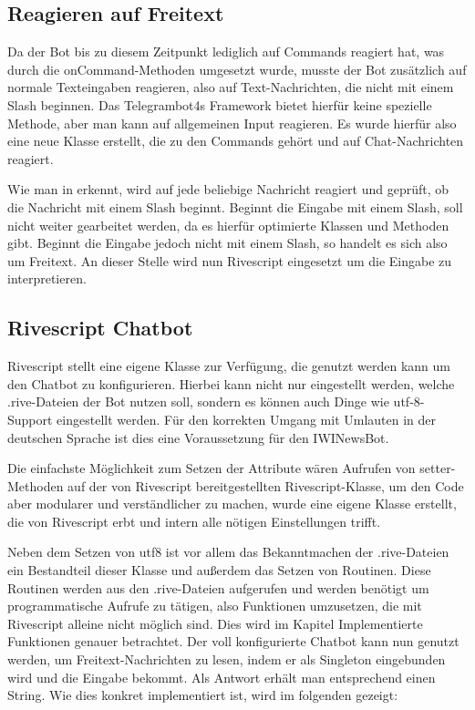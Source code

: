 \subsection{Reagieren auf Freitext}
Da der Bot bis zu diesem Zeitpunkt lediglich auf Commands reagiert hat, was durch die onCommand-Methoden umgesetzt wurde, musste der Bot zusätzlich auf normale Texteingaben reagieren, also auf Text-Nachrichten, die nicht mit einem Slash beginnen. Das Telegrambot4s Framework bietet hierfür keine spezielle Methode, aber man kann auf allgemeinen Input reagieren.
Es wurde hierfür also eine neue Klasse erstellt, die zu den Commands gehört und auf Chat-Nachrichten reagiert. 


Wie man in  erkennt, wird auf jede beliebige Nachricht reagiert und geprüft, ob die Nachricht mit einem Slash beginnt. Beginnt die Eingabe mit einem Slash, soll nicht weiter gearbeitet werden, da es hierfür optimierte Klassen und Methoden gibt. Beginnt die Eingabe jedoch nicht mit einem Slash, so handelt es sich also um Freitext. An dieser Stelle wird nun Rivescript eingesetzt um die Eingabe zu interpretieren.

\subsection{Rivescript Chatbot}
Rivescript stellt eine eigene Klasse zur Verfügung, die genutzt werden kann um den Chatbot zu konfigurieren. Hierbei kann nicht nur eingestellt werden, welche .rive-Dateien der Bot nutzen soll, sondern es können auch Dinge wie utf-8-Support eingestellt werden. Für den korrekten Umgang mit Umlauten in der deutschen Sprache ist dies eine Voraussetzung für den IWINewsBot.

Die einfachste Möglichkeit zum Setzen der Attribute wären Aufrufen von setter-Methoden auf der von Rivescript bereitgestellten Rivescript-Klasse, um den Code aber modularer und verständlicher  zu machen, wurde eine eigene Klasse erstellt, die von Rivescript erbt und intern alle nötigen Einstellungen trifft.


Neben dem Setzen von utf8 ist vor allem das Bekanntmachen der .rive-Dateien ein Bestandteil dieser Klasse und außerdem das Setzen von Routinen. Diese Routinen werden aus den .rive-Dateien aufgerufen und werden benötigt um programmatische Aufrufe zu tätigen, also Funktionen umzusetzen, die mit Rivescript alleine nicht möglich sind. Dies wird im Kapitel Implementierte Funktionen genauer betrachtet.
Der voll konfigurierte Chatbot kann nun genutzt werden, um Freitext-Nachrichten zu lesen, indem er als Singleton eingebunden wird und die Eingabe bekommt. Als Antwort erhält man entsprechend einen String. Wie dies konkret implementiert ist, wird im folgenden gezeigt:


